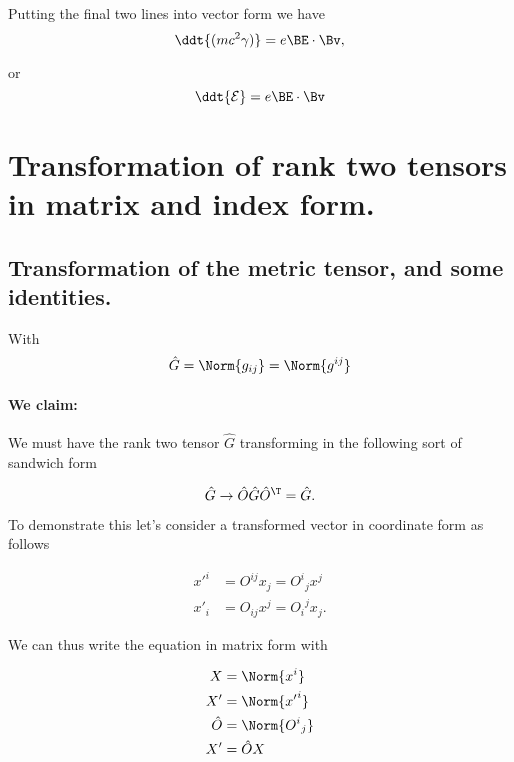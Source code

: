 Putting the final two lines into vector form we have
\begin{equation}\label{eqn:relativisticElectrodynamicsL11:330}
\ddt{ (m c^2 \gamma)} = e \BE \cdot \Bv,
\end{equation}

or
\begin{equation}\label{eqn:relativisticElectrodynamicsL11:350}
\ddt{ \mathcal{E} } = e \BE \cdot \Bv
\end{equation}

\section{Transformation of rank two tensors in matrix and index form.}

\subsection{Transformation of the metric tensor, and some identities.}

With
\begin{equation}\label{eqn:relativisticElectrodynamicsL11:410}
\hat{G} = \Norm{ g_{ij} } = \Norm{ g^{ij} }
\end{equation}

\paragraph{We claim:}
We must have the rank two tensor $\hat{G}$ transforming in the following sort of sandwich form

\begin{equation}\label{eqn:relativisticElectrodynamicsL11:430}
\hat{G} \rightarrow \hat{O} \hat{G} \hat{O}^\T = \hat{G}.
\end{equation}

To demonstrate this let's consider a transformed vector in coordinate form as follows

\begin{align}\label{eqn:relativisticElectrodynamicsL11:450}
{x'}^i &= O^{i j} x_j = {O^i}_j x^j \\
{x'}_i &= O_{i j} x^j = {O_i}^j x_j.
\end{align}

We can thus write the equation in matrix form with

\begin{align}\label{eqn:relativisticElectrodynamicsL11:940}
X &= \Norm{x^i} \\
X' &= \Norm{{x'}^i} \\
\hat{O} &= \Norm{{O^i}_j} \\
X' &= \hat{O} X
\end{align}

